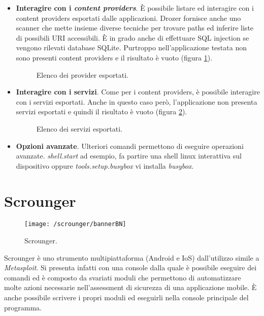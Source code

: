 \begin{itemize}
	\item \textbf{Interagire con i \emph{content providers}}. È possibile listare ed interagire con i content providers esportati dalle applicazioni. Drozer fornisce anche uno scanner che mette insieme diverse tecniche per trovare paths ed inferire liste di possibili URI accessibili. È in grado anche di effettuare SQL injection se vengono rilevati database SQLite. Purtroppo nell'applicazione testata non sono presenti content providers e il risultato è vuoto (figura \ref{fig:provider}).
	\begin{figure}[h]
		\centering 
		\caption{Elenco dei provider esportati.}
		\label{fig:provider}
	\end{figure}

	\item \textbf{Interagire con i servizi}. Come per i content providers, è possibile interagire con i servizi esportati. Anche in questo caso però, l'applicazione non presenta servizi esportati e quindi il risultato è vuoto (figura \ref{fig:services}).
	\begin{figure}[h]
		\centering 
		\caption{Elenco dei servizi esportati.}
		\label{fig:services}
	\end{figure}

	\item \textbf{Opzioni avanzate}. Ulteriori comandi permettono di eseguire operazioni avanzate. \emph{shell.start} ad esempio, fa partire una shell linux interattiva sul dispositivo oppure \emph{tools.setup.busybox} vi installa \emph{busybox}.
\end{itemize}


\section{Scrounger}
\begin{figure}[h]
	\centering 
	\texttt{[image: /scrounger/bannerBN]} 
	\caption{Scrounger.}
	\label{fig:scrounger}
\end{figure}
Scrounger\cite{Scrounger} è uno strumento multipiattaforma (Android e IoS) dall'utilizzo simile a \emph{Metasploit}. Si presenta infatti con una console dalla quale è possibile eseguire dei comandi ed è composto da svariati moduli che permettono di automatizzare molte azioni necessarie nell'assessment di sicurezza di una applicazione mobile. È anche possibile scrivere i propri moduli ed eseguirli nella console principale del programma.

